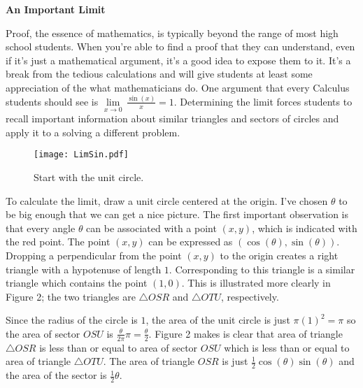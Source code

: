 \documentclass[12pt]{article}
\begin{document}
\begin{center}
\Large{\textbf{An Important Limit}}
\end{center}
Proof, the essence of mathematics, is typically beyond the range of most high school students.
When you're able to find a proof that they can understand, even if it's just a mathematical
argument, it's a good idea to expose them to it. It's a break from the tedious calculations and
will give students at least some appreciation of the what mathematicians do. One argument
that every Calculus students should see is $\underset{x \to 0}{\lim}\,\frac{\sin(x)}{x}=1$.
Determining the limit forces students to recall important information about similar triangles and 
sectors of circles and apply it to a solving a different problem.

\begin{wrapfigure}{l}{7.cm}
\texttt{[image: LimSin.pdf]}
\caption{Start with the unit circle.} \label{fg:ucatO}
\end{wrapfigure}
To calculate the limit, draw a unit circle centered at the origin. I've chosen $\theta$ to 
be big enough that we can get a nice picture. The first important observation is that every 
angle $\theta$ can be associated with a point $(x, y)$, which is indicated with the red 
point. The point $(x, y)$ can be expressed as $(\cos(\theta), \sin(\theta))$. Dropping 
a perpendicular from the point $(x, y)$ to the origin creates a right triangle 
with a hypotenuse of length $1$. Corresponding to this triangle is a similar triangle 
which contains the point $(1,0)$. This is illustrated more clearly in Figure 2; the two 
triangles are $\triangle OSR$ and $\triangle OTU$, respectively.

Since the radius of the circle is $1$, the area of the unit circle is just $\pi(1)^2=\pi$ so the 
area of sector $OSU$ is $\frac{\theta}{2\pi}\pi=\frac{\theta}{2}$. Figure 2 makes is clear that 
area of triangle $\triangle OSR$ is less than or equal to area of sector $OSU$  which is less 
than or equal to area of triangle $\triangle OTU$. The area of triangle $OSR$ is just 
$\frac{1}{2}\cos(\theta)\sin(\theta)$ and the area of the sector is $\frac{1}{2}\theta$. 
\end{document}
